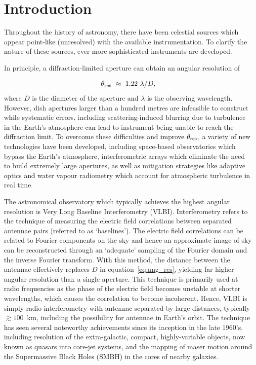 \chapter{Introduction}

Throughout the history of astronomy, there have been celestial sources which appear point-like (unresolved) with the available instrumentation. To clarify the nature of these sources, ever more sophisticated instruments are developed. 

In principle, a diffraction-limited aperture can obtain an angular resolution of

\begin{equation}\label{eq:ang_res}
 \theta_{\rm res}\ \approx \ 1.22\ \lambda / D,
\end{equation}
where $D$ is the diameter of the aperture and $\lambda$ is the observing wavelength. However, dish apertures larger than a hundred metres are infeasible to construct while systematic errors, including scattering-induced blurring due to turbulence in the Earth's atmosphere can lead to instrument being unable to reach the diffraction limit. To overcome these difficulties and improve $\theta_{\rm res}$, a variety of new technologies have been developed, including space-based observatories which bypass the Earth's atmosphere, interferometric arrays which eliminate the need to build extremely large apertures, as well as mitigation strategies like adaptive optics and water vapour radiometry which account for atmospheric turbulence in real time.  


The astronomical observatory which typically achieves the highest angular resolution is Very Long Baseline Interferometry (VLBI). Interferometry  refers to the technique of measuring the electric field correlations between separated antennae pairs (referred to as `baselines'). The electric field correlations can be related to Fourier components on the sky and hence an approximate image of sky can be reconstructed through an `adequate' sampling of the Fourier domain and the inverse Fourier transform. With this method, the distance between the antennae effectively replaces $D$ in equation~\ref{eq:ang_res}, yielding far higher angular resolution than a single aperture. This technique is primarily used at radio frequencies as the phase of the electric field becomes unstable at shorter wavelengths, which causes the correlation to become incoherent. Hence, VLBI is simply radio interferometry with antennae separated by large distances, typically $\gtrsim 100$~km, including the possibility for antennae in Earth's orbit. The technique has seen several noteworthy achievements since its inception in the late 1960's, including resolution of the extra-galactic, compact, highly-variable objects, now known as quasars into core-jet systems, and the mapping of maser motion around the Supermassive Black Holes (SMBH) in the cores of nearby galaxies.

